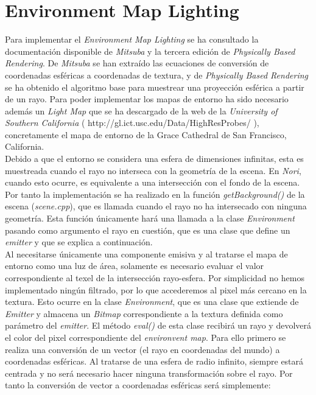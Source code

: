\documentclass[10pt,oneside,a4paper]{article}
\begin{document}
\newpage

\section{Environment Map Lighting}
Para implementar el \emph{Environment Map Lighting} se ha consultado la documentación disponible de \emph{Mitsuba} y la tercera edición de \emph{Physically Based Rendering}. De \emph{Mitsuba} se han extraído las ecuaciones de conversión de coordenadas esféricas a coordenadas de textura, y de \emph{Physically Based Rendering} se ha obtenido el algoritmo base para muestrear una proyección esférica a partir de un rayo. Para poder implementar los mapas de entorno ha sido necesario además un \emph{Light Map} que se ha descargado de la web de la \emph{University of Southern California} ( http://gl.ict.usc.edu/Data/HighResProbes/ ), concretamente el mapa de entorno de la Grace Cathedral de San Francisco, California.\\

Debido a que el entorno se considera una esfera de dimensiones infinitas, esta es muestreada cuando el rayo no interseca con la geometría de la escena. En \emph{Nori}, cuando esto ocurre, es equivalente a una intersección con el fondo de la escena. Por tanto la implementación se ha realizado en la función \emph{getBackground()} de la escena (\emph{scene.cpp}), que es llamada cuando el rayo no ha intersecado con ninguna geometría. Esta función únicamente hará una llamada a la clase \emph{Environment} pasando como argumento el rayo en cuestión, que es una clase que define un \emph{emitter} y que se explica a continuación.\\

Al necesitarse únicamente una componente emisiva y al tratarse el mapa de entorno como una luz de área, solamente es necesario evaluar el valor correspondiente al texel de la intersección rayo-esfera. Por simplicidad no hemos implementado ningún filtrado, por lo que accederemos al pixel más cercano en la textura. Esto ocurre en la clase \emph{Environment}, que es una clase que extiende de \emph{Emitter} y almacena un \emph{Bitmap} correspondiente a la textura definida como parámetro del \emph{emitter}. El método \emph{eval()} de esta clase recibirá un rayo y devolverá el color del pixel correspondiente del \emph{environvent map}. Para ello primero se realiza una conversión de un vector (el rayo en coordenadas del mundo) a coordenadas esféricas. Al tratarse de una esfera de radio infinito, siempre estará centrada y no será necesario hacer ninguna transformación sobre el rayo. Por tanto la conversión de vector a coordenadas esféricas será simplemente:
\end{document}
